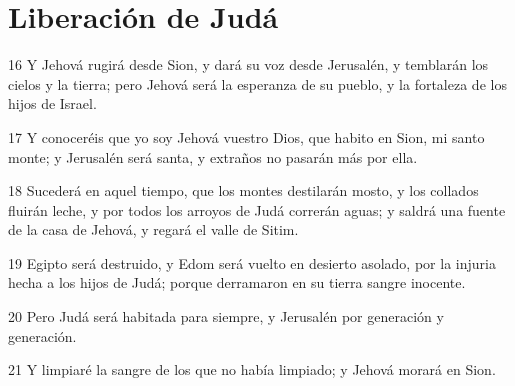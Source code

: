 \section*{Liberación de Judá}

\par 16 Y Jehová rugirá desde Sion, y dará su voz desde Jerusalén, y temblarán los cielos y la tierra; pero Jehová será la esperanza de su pueblo, y la fortaleza de los hijos de Israel.
\par 17 Y conoceréis que yo soy Jehová vuestro Dios, que habito en Sion, mi santo monte; y Jerusalén será santa, y extraños no pasarán más por ella.
\par 18 Sucederá en aquel tiempo, que los montes destilarán mosto, y los collados fluirán leche, y por todos los arroyos de Judá correrán aguas; y saldrá una fuente de la casa de Jehová, y regará el valle de Sitim.
\par 19 Egipto será destruido, y Edom será vuelto en desierto asolado, por la injuria hecha a los hijos de Judá; porque derramaron en su tierra sangre inocente.
\par 20 Pero Judá será habitada para siempre, y Jerusalén por generación y generación.
\par 21 Y limpiaré la sangre de los que no había limpiado; y Jehová morará en Sion.

